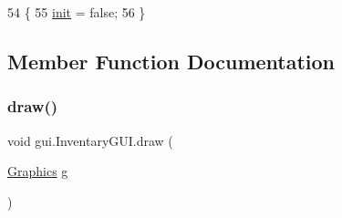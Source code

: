 \begin{DoxyCode}
54                            \{
55         \mbox{\hyperlink{classgui_1_1_inventary_g_u_i_a49c7773a4aeb02c46640af69f5f10b15}{init}} = \textcolor{keyword}{false};
56     \}
\end{DoxyCode}


\subsection{Member Function Documentation}
\mbox{\label{classgui_1_1_inventary_g_u_i_acc977ebfefac72a3cd4cc02ace1f5f6c}} 
\subsubsection{\texorpdfstring{draw()}{draw()}}
{\footnotesize\ttfamily void gui.\+Inventary\+G\+U\+I.\+draw (\begin{DoxyParamCaption}\item[{\mbox{\hyperlink{classorg_1_1newdawn_1_1slick_1_1_graphics}{Graphics}}}]{g }\end{DoxyParamCaption})\hspace{0.3cm}{\ttfamily [inline]}}


